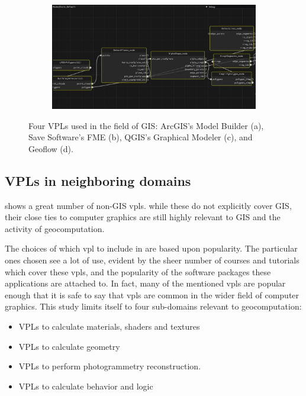 \begin{figure}
\begin{subfigure}[c]{0.45\linewidth}
  \caption{}\label{fig:gisvpl:3}
\end{subfigure}%
\qquad 
\begin{subfigure}[d]{0.45\linewidth}
  \centering
  \graphicspath{{../../assets/images/background/geo-vpl/}}
  \includegraphics[width=\linewidth]{geoflow.png}
  \caption{}\label{fig:gisvpl:4}
\end{subfigure}%
\caption[GIS VPLs]{Four VPLs used in the field of GIS: ArcGIS's Model Builder (a), Save Software's FME (b), QGIS's Graphical Modeler (c), and Geoflow (d).}
\label{fig:gisvpl}
\end{figure}

\subsection*{ VPLs in neighboring domains }

 shows a great number of non-GIS \ac{vpl}s.
while these do not explicitly cover GIS, their close ties to computer graphics are still highly relevant to GIS and the activity of geocomputation.  

The choices of which vpl to include in  are based upon popularity.  
The particular ones chosen see a lot of use, evident by the sheer number of courses and tutorials which cover these vpls, and the popularity of the software packages these applications are attached to. 
In fact, many of the mentioned vpls are popular enough that it is safe to say that \ac{vpl}s are common in the wider field of computer graphics. 
This study limits itself to four sub-domains relevant to geocomputation:
\begin{itemize}[-]
  \item VPLs to calculate materials, shaders and textures
  \item VPLs to calculate geometry
  \item VPLs to perform photogrammetry reconstruction. 
  \item VPLs to calculate behavior and logic
\end{itemize}

